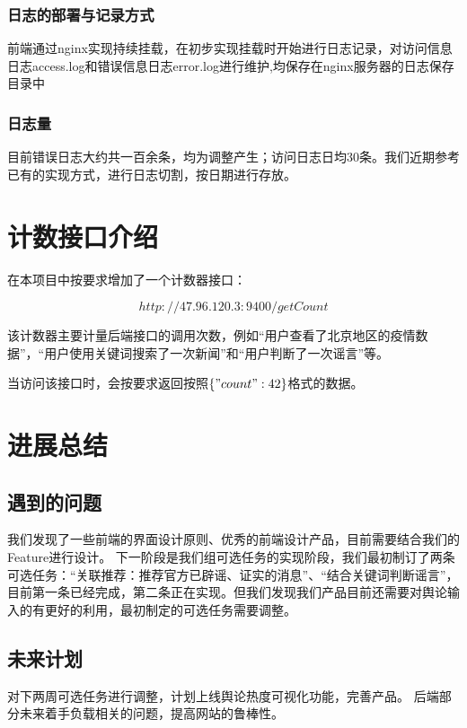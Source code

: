 \documentclass{article}
\begin{document}
\subsubsection{日志的部署与记录方式}
前端通过nginx实现持续挂载，在初步实现挂载时开始进行日志记录，对访问信息日志access.log和错误信息日志error.log进行维护,均保存在nginx服务器的日志保存目录中
\subsubsection{日志量}
目前错误日志大约共一百余条，均为调整产生；访问日志日均30条。我们近期参考已有的实现方式，进行日志切割，按日期进行存放。

\section{计数接口介绍}

在本项目中按要求增加了一个计数器接口：

$$http://47.96.120.3:9400/getCount$$

该计数器主要计量后端接口的调用次数，例如“用户查看了北京地区的疫情数据”，“用户使用关键词搜索了一次新闻”和“用户判断了一次谣言”等。

当访问该接口时，会按要求返回按照$\{"count": 42\}$格式的数据。

\section{进展总结}

\subsection{遇到的问题}
我们发现了一些前端的界面设计原则、优秀的前端设计产品，目前需要结合我们的Feature进行设计。
下一阶段是我们组可选任务的实现阶段，我们最初制订了两条可选任务：“关联推荐：推荐官方已辟谣、证实的消息”、“结合关键词判断谣言”，目前第一条已经完成，第二条正在实现。但我们发现我们产品目前还需要对舆论输入的有更好的利用，最初制定的可选任务需要调整。
\subsection{未来计划}
对下两周可选任务进行调整，计划上线舆论热度可视化功能，完善产品。
后端部分未来着手负载相关的问题，提高网站的鲁棒性。
\end{document}
